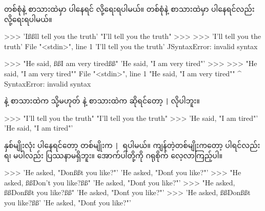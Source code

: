  တစ်စုံနဲ့ စာသားထဲမှာ   ပါနေရင်  လို့ရေးရပါမယ်။  တစ်စုံနဲ့ စာသားထဲမှာ   ပါနေရင်လည်း  လို့ရေးရပါမယ်။ %
\begin{codetxt}
>>> 'Ißßll tell you the truth'
"I'll tell you the truth"
>>>
>>> 'I'll tell you the truth'
  File "<stdin>", line 1
    'I'll tell you the truth'
       ^^
SyntaxError: invalid syntax
\end{codetxt}
\betweenminted{\medskipamount}
\begin{codetxt}
>>> "He said, ßßI am very tiredßß"
'He said, "I am very tired"'
>>>
>>> "He said, "I am very tired""
  File "<stdin>", line 1
    "He said, "I am very tired""
               ^
SyntaxError: invalid syntax
\end{codetxt}

 နဲ့ စာသားထဲက  သို့မဟုတ်  နဲ့ စာသားထဲက  ဆိုရင်တော့ \texttt|\| မလိုပါဘူး။ 
\begin{codetxt}
>>> "I'll tell you the truth"
"I'll tell you the truth"
>>> 'He said, "I am tired"'
'He said, "I am tired"'
\end{codetxt}
နှစ်မျိုးလုံး ပါနေရင်တော့ တစ်မျိုးက  \texttt|\| ပါရပါမယ်။ ကျန်တဲ့တစ်မျိုးကတော့ ပါရင်လည်းရ၊ မပါလည်း ပြဿနာမရှိဘူး။ အောက်ပါတို့ကို ဂရုစိုက် လေ့လာကြည့်ပါ။ 
\begin{codetxt}
>>> 'He asked, "Donßßt you like?"'
'He asked, "Don\'t you like?"'
>>> "He asked, ßßDon't you like?ßß"
'He asked, "Don\'t you like?"'
>>> "He asked, ßßDonßßt you like?ßß"
'He asked, "Don\'t you like?"'
>>> 'He asked, ßßDonßßt you like?ßß'
'He asked, "Don\'t you like?"'
\end{codetxt}

